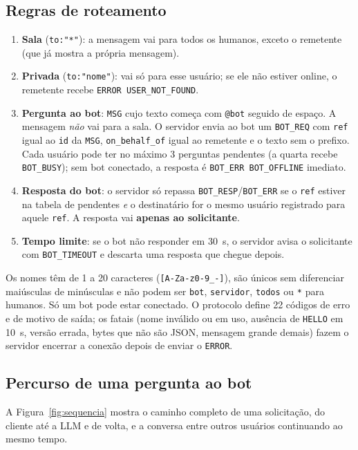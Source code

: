 \documentclass[11pt,a4paper]{article}
\newcommand{\cod}[1]{\texttt{#1}}
\begin{document}
\subsection{Regras de roteamento}
\begin{enumerate}
  \item \textbf{Sala} (\cod{to:"*"}): a mensagem vai para todos os humanos, exceto o remetente
        (que já mostra a própria mensagem).
  \item \textbf{Privada} (\cod{to:"nome"}): vai só para esse usuário; se ele não estiver online,
        o remetente recebe \cod{ERROR USER\_NOT\_FOUND}.
  \item \textbf{Pergunta ao bot}: \cod{MSG} cujo texto começa com \cod{@bot} seguido de espaço.
        A mensagem \emph{não} vai para a sala. O servidor envia ao bot um \cod{BOT\_REQ} com
        \cod{ref} igual ao \cod{id} da \cod{MSG}, \cod{on\_behalf\_of} igual ao remetente e o texto
        sem o prefixo. Cada usuário pode ter no máximo 3 perguntas pendentes (a quarta recebe
        \cod{BOT\_BUSY}); sem bot conectado, a resposta é \cod{BOT\_ERR BOT\_OFFLINE} imediato.
  \item \textbf{Resposta do bot}: o servidor só repassa \cod{BOT\_RESP}/\cod{BOT\_ERR} se o
        \cod{ref} estiver na tabela de pendentes \emph{e} o destinatário for o mesmo usuário
        registrado para aquele \cod{ref}. A resposta vai \textbf{apenas ao solicitante}.
  \item \textbf{Tempo limite}: se o bot não responder em 30~s, o servidor avisa o solicitante com
        \cod{BOT\_TIMEOUT} e descarta uma resposta que chegue depois.
\end{enumerate}

Os nomes têm de 1 a 20 caracteres (\cod{[A-Za-z0-9\_-]}), são únicos sem diferenciar maiúsculas
de minúsculas e não podem ser \cod{bot}, \cod{servidor}, \cod{todos} ou \cod{*} para humanos. Só um
bot pode estar conectado. O protocolo define 22 códigos de erro e de motivo de saída; os fatais
(nome inválido ou em uso, ausência de \cod{HELLO} em 10~s, versão errada, bytes que não são JSON,
mensagem grande demais) fazem o servidor encerrar a conexão depois de enviar o \cod{ERROR}.

\subsection{Percurso de uma pergunta ao bot}
A Figura~\ref{fig:sequencia} mostra o caminho completo de uma solicitação, do cliente até a LLM e
de volta, e a conversa entre outros usuários continuando ao mesmo tempo.
\end{document}
